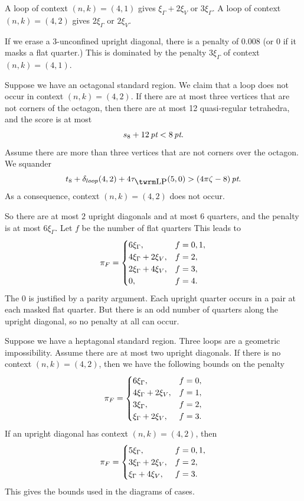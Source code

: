 A loop of context $(n,k)=(4,1)$ gives $\xi_\Gamma+2\xi_V$ or
$3\xi_\Gamma$.  A loop of context $(n,k)=(4,2)$ gives
$2\xi_\Gamma$ or $2\xi_V$.

If we erase a $3$-unconfined upright diagonal, there is a penalty
of $0.008$ (or 0 if it masks a flat quarter.) This is dominated by
the penalty $3\xi_\Gamma$ of context $(n,k)=(4,1)$.

Suppose we have an octagonal standard region.  We claim that a
loop does not occur in context $(n,k)=(4,2)$. If there are at most
three vertices that are not corners of the octagon, then there are
at most 12 quasi-regular tetrahedra, and the score is at most
$$s_8 + 12\,\hbox{\it pt}<8\,\hbox{\it pt}.$$
Assume there are more than three vertices that are not corners
over the octagon. We squander
$$t_8+ \dloop(4,2)+4\tlp(5,0) > \squander.$$
As a consequence, context $(n,k)=(4,2)$ does not occur.

So there are at most $2$ upright diagonals and at most $6$
quarters, and the penalty is at most $6\xi_\Gamma$. Let $f$ be the
number of flat quarters This leads to
    $$
    {\pi_F} = \begin{cases} 6\xi_\Gamma, & f=0,1,\\
                   4\xi_\Gamma+2\xi_V, & f=2,\\
                    2\xi_\Gamma+4\xi_V, & f=3,\\
                    0, & f=4.
            \end{cases}
    $$
The 0 is justified by a parity argument.  Each upright quarter
occurs in a pair at each masked flat quarter.  But there is an odd
number of quarters along the upright diagonal, so no penalty at
all can occur.

Suppose we have a heptagonal standard region.  Three loops are a
geometric impossibility. Assume there are at most two upright
diagonals.
 If there is no context $(n,k)=(4,2)$,
 then we have the following bounds on the penalty
    $$
    {\pi_F} = \begin{cases} 6\xi_\Gamma, & f=0,\\
                 4\xi_\Gamma+2\xi_V, & f=1,\\
                3\xi_\Gamma, & f=2,\\
                \xi_\Gamma+2\xi_V, & f=3.
            \end{cases}
    $$
If an upright diagonal has context $(n,k)=(4,2)$, then
    $$
    {\pi_F} = \begin{cases} 5\xi_\Gamma, & f=0,1,\\
                3\xi_\Gamma + 2\xi_V, & f=2,\\
                \xi_\Gamma + 4 \xi_V, &f = 3.\\
            \end{cases}
    $$
This gives the bounds used in the diagrams of cases.



